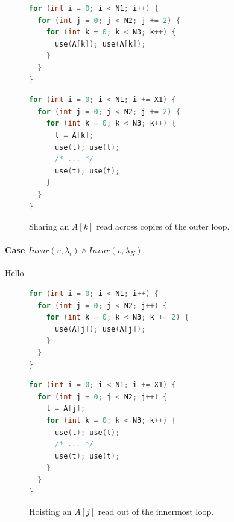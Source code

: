\begin{figure}[H]
  \centering
  \begin{minipage}[t]{0.48\textwidth}
\begin{lstlisting}[language=C, basicstyle=\ttfamily\scriptsize,
  aboveskip=2pt, belowskip=2pt,
  caption={Reads of A with $j$ advanced by two},
  label={lst:ck94-reg-invar-outer-j-step-two}]
for (int i = 0; i < N1; i++) {
  for (int j = 0; j < N2; j += 2) {
    for (int k = 0; k < N3; k++) {
      use(A[k]); use(A[k]);
    }
  }
}
\end{lstlisting}
  \end{minipage}%
  \hfill
  \begin{minipage}[t]{0.48\textwidth}
\begin{lstlisting}[language=C, basicstyle=\ttfamily\scriptsize,
  aboveskip=2pt, belowskip=2pt,
  caption={Shared value from A after unrolling $i$},
  label={lst:ck94-reg-invar-outer-i-unrolled-shared}]
for (int i = 0; i < N1; i += X1) { 
  for (int j = 0; j < N2; j += 2) {
    for (int k = 0; k < N3; k++) {
      t = A[k];
      use(t); use(t);
      /* ... */
      use(t); use(t);
    }
  }
}
\end{lstlisting}
  \end{minipage}
  \caption{Sharing an $A[k]$ read across copies of the outer loop.}
  \label{fig:ck94-reg-invar-outer}
\end{figure}

\paragraph{Case $Invar(v, \lambda_i) \land Invar(v, \lambda_N)$} Hello
\begin{figure}[H]
  \centering
  \begin{minipage}[t]{0.48\textwidth}
\begin{lstlisting}[language=C, basicstyle=\ttfamily\scriptsize,
  aboveskip=2pt, belowskip=2pt,
  caption={Reads of A with $k$ advanced by two},
  label={lst:ck94-reg-invar-inner-k-step-two}]
for (int i = 0; i < N1; i++) { 
  for (int j = 0; j < N2; j++) {
    for (int k = 0; k < N3; k += 2) {
      use(A[j]); use(A[j]);
    }
  }
}
\end{lstlisting}
  \end{minipage}%
  \hfill
  \begin{minipage}[t]{0.48\textwidth}
\begin{lstlisting}[language=C, basicstyle=\ttfamily\scriptsize,
  aboveskip=2pt, belowskip=2pt,
  caption={Load from A hoisted after unrolling $i$},
  label={lst:ck94-reg-invar-inner-i-unrolled-hoisted}]
for (int i = 0; i < N1; i += X1) {
  for (int j = 0; j < N2; j++) {
    t = A[j];
    for (int k = 0; k < N3; k++) {
      use(t); use(t);
      /* ... */
      use(t); use(t);
    }
  }
}
\end{lstlisting}
  \end{minipage}
  \caption{Hoisting an $A[j]$ read out of the innermost loop.}
  \label{fig:ck94-reg-invar-inner}
\end{figure}

